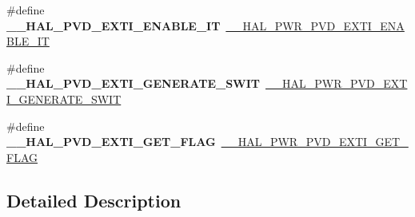 \begin{DoxyCompactItemize}
\item 
\#define {\bfseries \+\_\+\+\_\+\+H\+A\+L\+\_\+\+P\+V\+D\+\_\+\+E\+X\+T\+I\+\_\+\+E\+N\+A\+B\+L\+E\+\_\+\+IT}~\hyperlink{group___p_w_r___exported___macro_ga3180f039cf14ef78a64089f387f8f9c2}{\+\_\+\+\_\+\+H\+A\+L\+\_\+\+P\+W\+R\+\_\+\+P\+V\+D\+\_\+\+E\+X\+T\+I\+\_\+\+E\+N\+A\+B\+L\+E\+\_\+\+IT}\hypertarget{group___h_a_l___p_w_r___aliased___macros_ga3259ab94dbb26432e4139917a4e04411}{}\label{group___h_a_l___p_w_r___aliased___macros_ga3259ab94dbb26432e4139917a4e04411}

\item 
\#define {\bfseries \+\_\+\+\_\+\+H\+A\+L\+\_\+\+P\+V\+D\+\_\+\+E\+X\+T\+I\+\_\+\+G\+E\+N\+E\+R\+A\+T\+E\+\_\+\+S\+W\+IT}~\hyperlink{group___p_w_r___exported___macro_gaba4a7968f5c4c4ca6a7047b147ba18d4}{\+\_\+\+\_\+\+H\+A\+L\+\_\+\+P\+W\+R\+\_\+\+P\+V\+D\+\_\+\+E\+X\+T\+I\+\_\+\+G\+E\+N\+E\+R\+A\+T\+E\+\_\+\+S\+W\+IT}\hypertarget{group___h_a_l___p_w_r___aliased___macros_gaf9d584e87f1888f0c39976613208a81e}{}\label{group___h_a_l___p_w_r___aliased___macros_gaf9d584e87f1888f0c39976613208a81e}

\item 
\#define {\bfseries \+\_\+\+\_\+\+H\+A\+L\+\_\+\+P\+V\+D\+\_\+\+E\+X\+T\+I\+\_\+\+G\+E\+T\+\_\+\+F\+L\+AG}~\hyperlink{group___p_w_r___exported___macro_ga5e66fa75359b51066e0731ac1e5ae438}{\+\_\+\+\_\+\+H\+A\+L\+\_\+\+P\+W\+R\+\_\+\+P\+V\+D\+\_\+\+E\+X\+T\+I\+\_\+\+G\+E\+T\+\_\+\+F\+L\+AG}\hypertarget{group___h_a_l___p_w_r___aliased___macros_ga1d5be8243a9659943e0b861d2d5ce923}{}\label{group___h_a_l___p_w_r___aliased___macros_ga1d5be8243a9659943e0b861d2d5ce923}

\end{DoxyCompactItemize}


\subsection{Detailed Description}
